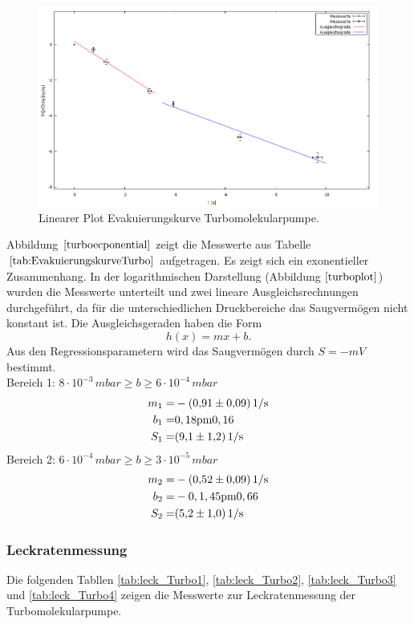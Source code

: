 \begin{figure}[H]
  \centering
  \includegraphics[width=14cm]{bilder/turbodruck plot.png}
  \caption{Linearer Plot Evakuierungskurve Turbomolekularpumpe.}
  \label{turboplot}
\end{figure}
Abbildung $\ref{turboecponential}$ zeigt die Messwerte aus Tabelle $\ref{tab:EvakuierungskurveTurbo}$ aufgetragen.
Es zeigt sich ein exonentieller Zusammenhang.
In der logarithmischen Darstellung (Abbildung $\ref{turboplot}$) wurden die Messwerte unterteilt und zwei lineare Ausgleichsrechnungen durchgeführt, da für die unterschiedlichen Druckbereiche das Saugvermögen nicht konstant ist.
Die Ausgleichsgeraden haben die Form
\begin{equation}
 h(x)=mx+b.
\end{equation}
Aus den Regressionsparametern wird das Saugvermögen durch $S=-mV$ bestimmt.\\

Bereich 1: $8 \cdot 10^{-3} \, \si{mbar} \geq b \geq 6 \cdot 10^{-4} \, \si{mbar}$\\
\begin{align*}
	m_1=& -\SI{0,91 \pm 0,09}{1/s}\\
	b_1=& \si{0,18 \pm 0,16}\\
	S_1=& \SI{9,1 \pm 1,2}{1/s}
\end{align*}
Bereich 2: $6 \cdot 10^{-4} \, \si{mbar} \geq b \geq 3 \cdot 10^{-5} \, \si{mbar}$\\
\begin{align*}
	m_2=& -\SI{0,52 \pm 0,09}{1/s}\\
	b_2=& -\si{0,1,45 \pm 0,66}\\
	S_2=& \SI{5,2 \pm 1,0}{1/s}
\end{align*}

\subsubsection{Leckratenmessung}
Die folgenden Tabllen \ref{tab:leck_Turbo1}, \ref{tab:leck_Turbo2}, \ref{tab:leck_Turbo3} und \ref{tab:leck_Turbo4} zeigen die Messwerte zur Leckratenmessung der Turbomolekularpumpe.

